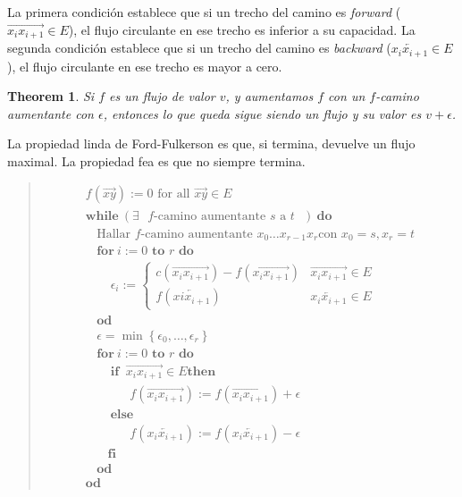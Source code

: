 \documentclass[a4paper, 12pt]{article}
\newtheorem{theorem}{Theorem}
\newtheorem{theorem}{Theorem}
\begin{document}
La primera condición establece que si un trecho del camino es \textit{forward}
($\overrightarrow{x_i x_{i+1}} \in E$), el flujo circulante en ese trecho es inferior
a su capacidad. La segunda condición establece que si un trecho del camino es
\textit{backward} ($\overleftarrow{x_{i}x_{i+1}} \in E$), el flujo circulante en
ese trecho es mayor a cero. 

\begin{theorem}
    Si $f$ es un flujo de valor $v$, y aumentamos $f$ con un $f$-camino
    aumentante con $\epsilon$, entonces lo que queda sigue siendo un flujo y su
    valor es $v + \epsilon$.
\end{theorem}

La propiedad linda de Ford-Fulkerson es que, si termina, devuelve un flujo
maximal. La propiedad fea es que no siempre termina.

\begin{quote}
\begin{align*}
    &f(\overrightarrow{xy}) := 0 \text{ for all $\overrightarrow{xy} \in E$ } \\ 
    &\textbf{while} ~ (\exists \text{ $f$-camino aumentante $s$ a $t$ })
    ~\textbf{do}\\
    & ~ ~ ~ ~\text{Hallar $f$-camino aumentante $x_0 \ldots x_{r-1}x_r$
    con $x_0 = s, x_{r} = t$}\\
    &~ ~ ~ ~ \textbf{for} ~ i := 0 \textbf{ to } r  \textbf{ do}\\ 
    &~ ~ ~ ~ ~ ~ ~ ~ ~ \epsilon_i := \begin{cases}
        c(\overrightarrow{x_ix_{i+1}}) - f(\overrightarrow{x_ix_{i+1}}) &
        \overrightarrow{x_ix_{i+1}}\in E\\ 
        f(\overleftarrow{x{i}x_{i+1}}) & \overleftarrow{x_{i}x_{i+1}} \in E
    \end{cases} &  \\
    &~ ~ ~ ~ \textbf{od}\\
    &~ ~ ~ ~  \epsilon = \min \left\{ \epsilon_0, \ldots, \epsilon_{r} \right\} \\
    &~ ~ ~ ~ \textbf{for} ~ i := 0 \textbf{ to } r  \textbf{ do}\\ 
    &~ ~ ~ ~ ~ ~ ~ ~ ~ \textbf{if } ~ \overrightarrow{x_ix_{i+1}} \in E \textbf{
    then}\\ 
    & ~ ~ ~ ~ ~ ~ ~ ~ ~ ~ ~ ~ ~ ~ ~ ~ f(\overrightarrow{x_{i}x_{i+1}}) :=
    f(\overrightarrow{x_{i}x_{i+1}}) + \epsilon\\
    & ~ ~ ~ ~ ~ ~ ~ ~ ~  \textbf{else} \\ 
    & ~ ~ ~ ~ ~ ~ ~ ~ ~ ~ ~ ~ ~ ~ ~ ~ f(\overleftarrow{x_{i}x_{i+1}}) :=
    f(\overleftarrow{x_{i}x_{i+1}}) - \epsilon\\
    & ~ ~ ~ ~ ~ ~ ~ ~  \textbf{fi}\\
    & ~ ~ ~ ~ \textbf{od}\\
    &\textbf{od}
\end{align*}

\end{quote}
\normalsize
\end{document}
